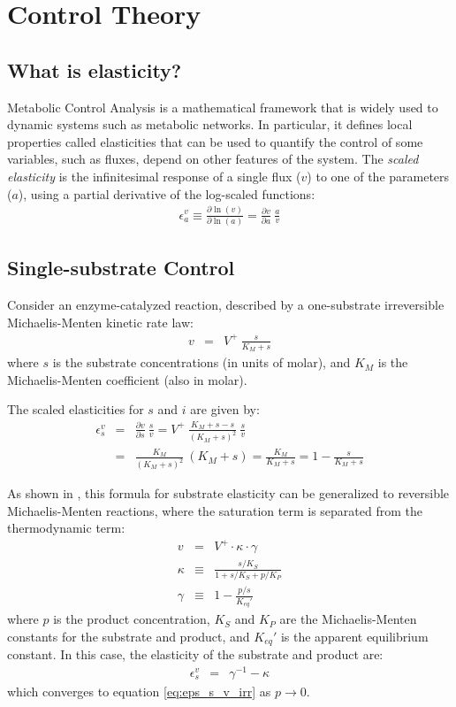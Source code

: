 \documentclass[12pt,a4paper]{article}
\begin{document}
\section{Control Theory}
\subsection{What is elasticity?}
Metabolic Control Analysis \cite{Fell1996-be} is a mathematical framework that is widely used to dynamic systems such as metabolic networks. In particular, it defines local properties called elasticities that can be used to quantify the control of some variables, such as fluxes, depend on other features of the system. The \emph{scaled elasticity} is the infinitesimal response of a single flux ($v$) to one of the parameters ($a$), using a partial derivative of the log-scaled functions:
\begin{eqnarray}
    \epsilon_a^v \equiv \frac{\partial \ln(v)}{\partial \ln(a)} = \frac{\partial v}{\partial a} ~ \frac{a}{v}
\end{eqnarray}

\subsection{Single-substrate Control}
Consider an enzyme-catalyzed reaction, described by a one-substrate irreversible Michaelis-Menten kinetic rate law:
\begin{eqnarray}
    v &=& V^+ ~ \frac{s}{K_M + s}
\end{eqnarray}
where $s$ is the substrate concentrations (in units of molar), and $K_M$ is the Michaelis-Menten coefficient (also in molar).

The scaled elasticities for $s$ and $i$ are given by:
\begin{eqnarray}
    \epsilon_s^v &=& \frac{\partial v}{\partial s} ~ \frac{s}{v} = V^+ ~ \frac{K_M + s - s}{(K_M + s)^2} ~ \frac{s}{v} \nonumber \\
    &=& \frac{K_M}{(K_M + s)^2} ~ (K_M + s) = \frac{K_M}{K_M + s} = 1 - \frac{s}{K_M + s}\label{eq:eps_s_v_irr}
\end{eqnarray}

As shown in \cite{Noor2013-vv}, this formula for substrate elasticity can be generalized to reversible Michaelis-Menten reactions, where the saturation term is separated from the thermodynamic term:
\begin{eqnarray}
    v &=& V^+ \cdot \kappa \cdot \gamma \\
    \kappa &\equiv& \frac{s/K_S}{1 + s/K_S + p/K_P} \\
    \gamma &\equiv& 1 - \frac{p/s}{K_{eq}'}
\end{eqnarray}
where $p$ is the product concentration, $K_S$ and $K_P$ are the Michaelis-Menten constants for the substrate and product, and $K_{eq}'$ is the apparent equilibrium constant. In this case, the elasticity of the substrate and product are:
\begin{eqnarray}
    \epsilon_s^v &=& \gamma^{-1} - \kappa
\end{eqnarray}
which converges to equation \ref{eq:eps_s_v_irr} as $p \rightarrow 0$.
\end{document}

